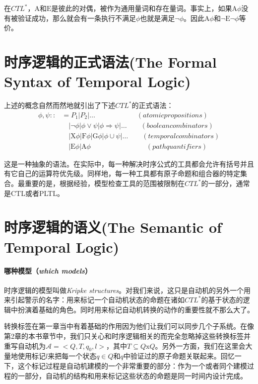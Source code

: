 \documentclass{book}
\begin{document}
    在$CTL^*$，$\mathrm{A}$和$\mathrm{E}$是彼此的对偶，被作为通用量词和存在量词。事实上，如果$\mathrm{A}\phi$没有被验证成功，那么就会有一条执行不满足$\phi$也就是满足$\neg \phi$。因此$\mathrm{A}\phi$和$\neg \mathrm{E}\neg\phi$等价。



    \section{时序逻辑的正式语法(The Formal Syntax of Temporal Logic)}

    \quad 上述的概念自然而然地就引出了下述$CTL^*$的正式语法：
    \begin{equation*}
      \begin{split}
         \phi,\psi :: & = P_1|P_2|\dots   \qquad\qquad\qquad (atomic propositions)\\
           & \quad |\neg\phi|\phi \vee \psi|\phi \Rightarrow\psi|\dots \qquad (boolean combinators)\\
           & \quad |\mathrm{X}\phi|\mathrm{F}\phi|\mathrm{G}\phi|\phi \cup \psi|\dots \qquad(temporal combinators)\\
           & \quad |\mathrm{E}\phi|\mathrm{A}\phi \qquad\qquad\qquad\qquad (path quantifiers)
      \end{split}
    \end{equation*}

    这是一种抽象的语法。在实际中，每一种解决时序公式的工具都会允许有括号并且有它自己的运算符优先级。同样地，每一种工具都有原子命题和组合器的特定集合。最重要的是，根据经验，模型检查工具的范围被限制在$CTL^*$的一部分，通常是CTL或者PLTL。

    \section{时序逻辑的语义(The Semantic of Temporal Logic)}

    \paragraph{哪种模型（{\itshape which models}）}时序逻辑的模型叫做{\itshape Kripke structures}。对我们来说，这只是自动机的另外一个用来引起警示的名字：用来标记一个自动机状态的命题在诸如$CTL^*$的基于状态的逻辑中扮演着基础的角色。同时用来标记自动机转换的动作的重要性就不那么大了。

    转换标签在第一章当中有着基础的作用因为他们让我们可以同步几个子系统。在像第2章的本书章节中，我们只关心和时序逻辑相关的而完全忽略掉这些转换标签并重写自动机为$\mathcal{A}=<Q,T,q_0,l>$，其中$T \subseteq Q \text{x} Q$。另外一方面，我们在这里会大量地使用标记$l$来把每一个状态$q \in Q$和$q$中验证过的原子命题关联起来。回忆一下，这个标记过程是自动机建模的一个非常重要的部分：作为一个或者同个建模过程的一部分，自动机的结构和用来标记这些状态的命题是同一时间内设计完成。
\end{document}
